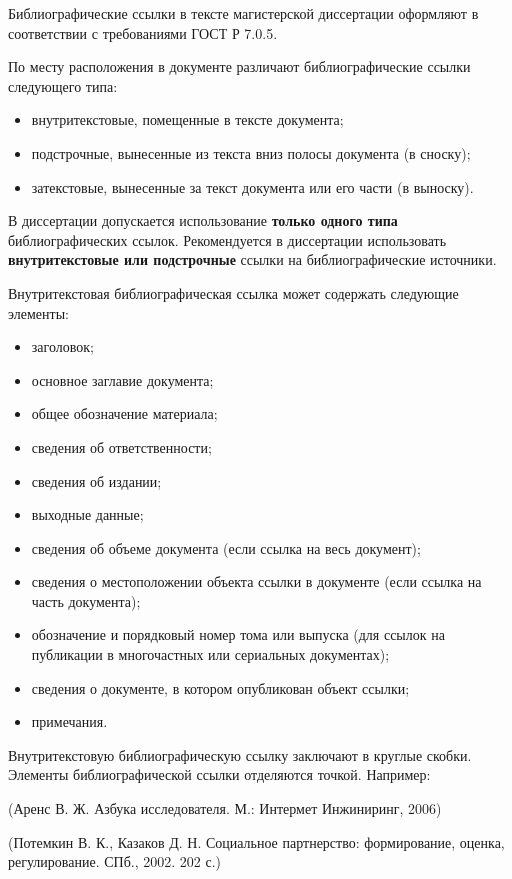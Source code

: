 \documentclass[12pt,a4paper, oneside]{extreport}
\begin{document}
Библиографические ссылки в тексте магистерской диссертации оформляют в соответствии с требованиями ГОСТ Р 7.0.5.

По месту расположения в документе различают библиографические ссылки  следующего типа:  
\begin{itemize}
\item внутритекстовые, помещенные в тексте документа; 
\item подстрочные, вынесенные из текста вниз полосы документа (в сноску);
\item затекстовые, вынесенные за текст документа или его части (в выноску).	
\end{itemize}

В диссертации допускается использование \textbf{только одного типа} библиографических ссылок. Рекомендуется в диссертации  использовать  \textbf{внутритекстовые или подстрочные} ссылки на библиографические источники. 

Внутритекстовая библиографическая ссылка может содержать следующие элементы:
\begin{itemize}
\item заголовок;
\item основное заглавие документа;
\item общее обозначение материала;
\item сведения об ответственности;
\item сведения об издании;
\item выходные данные;
\item сведения об объеме документа (если ссылка на весь документ);
\item сведения о местоположении объекта ссылки в документе (если ссылка на часть документа);
\item обозначение и порядковый номер тома или выпуска (для ссылок на публикации в многочастных или сериальных документах);
\item сведения о документе, в котором опубликован объект ссылки;
\item примечания.	
\end{itemize}

Внутритекстовую библиографическую ссылку заключают в круглые скобки. Элементы 
библиографической ссылки отделяются точкой. Например:

(Аренс В. Ж. Азбука исследователя. М.: Интермет Инжиниринг, 2006)

(Потемкин В. К., Казаков Д. Н. Социальное партнерство: формирование, оценка, регулирование. СПб., 2002. 202 с.)
\end{document}
